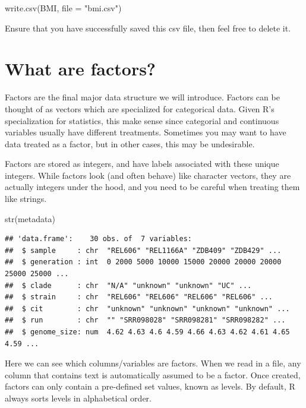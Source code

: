 \documentclass[
]{book}
\newenvironment{Shaded}{\begin{snugshade}}{\end{snugshade}}
\newcommand{\AttributeTok}[1]{\textcolor[rgb]{0.77,0.63,0.00}{#1}}
\newcommand{\FunctionTok}[1]{\textcolor[rgb]{0.00,0.00,0.00}{#1}}
\newcommand{\NormalTok}[1]{#1}
\newcommand{\StringTok}[1]{\textcolor[rgb]{0.31,0.60,0.02}{#1}}
\begin{document}
\begin{Shaded}
\begin{Highlighting}[]
\FunctionTok{write.csv}\NormalTok{(BMI, }\AttributeTok{file =} \StringTok{"bmi.csv"}\NormalTok{)}
\end{Highlighting}
\end{Shaded}

Ensure that you have successfully saved this csv file, then feel free to delete it.

\hypertarget{what-are-factors}{%
\section{What are factors?}\label{what-are-factors}}

Factors are the final major data structure we will introduce. Factors can be thought of as vectors which are specialized for categorical data. Given R's specialization for statistics, this make sense since categorial and continuous variables usually have different treatments. Sometimes you may want to have data treated as a factor, but in other cases, this may be undesirable.

Factors are stored as integers, and have labels associated with these unique integers. While factors look (and often behave) like character vectors, they are actually integers under the hood, and you need to be careful when treating them like strings.

\begin{Shaded}
\begin{Highlighting}[]
\FunctionTok{str}\NormalTok{(metadata)}
\end{Highlighting}
\end{Shaded}

\begin{verbatim}
## 'data.frame':    30 obs. of  7 variables:
##  $ sample     : chr  "REL606" "REL1166A" "ZDB409" "ZDB429" ...
##  $ generation : int  0 2000 5000 10000 15000 20000 20000 20000 25000 25000 ...
##  $ clade      : chr  "N/A" "unknown" "unknown" "UC" ...
##  $ strain     : chr  "REL606" "REL606" "REL606" "REL606" ...
##  $ cit        : chr  "unknown" "unknown" "unknown" "unknown" ...
##  $ run        : chr  "" "SRR098028" "SRR098281" "SRR098282" ...
##  $ genome_size: num  4.62 4.63 4.6 4.59 4.66 4.63 4.62 4.61 4.65 4.59 ...
\end{verbatim}

Here we can see which columns/variables are factors. When we read in a file, any column that contains text is automatically assumed to be a factor. Once created, factors can only contain a pre-defined set values, known as levels. By default, R always sorts levels in alphabetical order.
\end{document}
